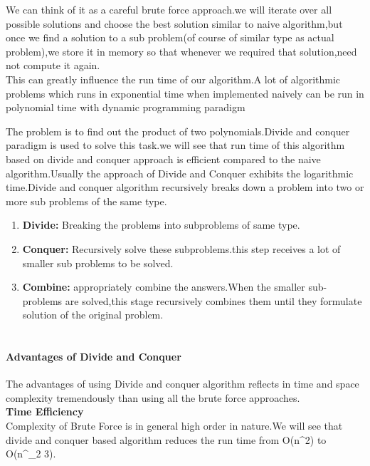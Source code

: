 \documentclass[10pt]{article}
\begin{document}
We can think of it as a careful brute force approach.we will iterate over all possible solutions and choose the best  solution similar to naive algorithm,but once we find a solution to a sub problem(of course of similar type as actual problem),we store it in memory so that whenever we required that solution,need not compute it again.\\

This can greatly influence the run time of our algorithm.A lot of algorithmic problems which runs in exponential time when implemented naively can be run in polynomial time with dynamic programming paradigm


\iffalse
  The problem is to find out the product of two polynomials.Divide and conquer paradigm is used to solve this task.we will see that run time of this algorithm based on divide and conquer approach is efficient compared to the naive algorithm.Usually the  approach  of Divide and Conquer exhibits the logarithmic time.Divide and conquer algorithm recursively breaks down a problem into two or more sub problems of the same type.

\begin{enumerate}
    \item\textbf{Divide:} Breaking the problems into subproblems of same type.
    \item\textbf{Conquer:} Recursively solve these subproblems.this step receives a lot of smaller sub problems to be solved.
    \item\textbf{Combine:} appropriately combine the answers.When the smaller sub-problems are solved,this stage recursively combines them until they formulate solution of the original problem.\\\\
\end{enumerate}



\paragraph{Advantages of Divide and Conquer}
The advantages of using Divide and conquer algorithm reflects in time and space complexity tremendously than using all the brute force approaches.\\

\textbf{Time Efficiency}\\Complexity of Brute Force is in general high order in nature.We will see that divide and conquer based algorithm reduces the run time from O(n^{2}) to  O(n^{\log _2 3}).\\\\
\end{document}
